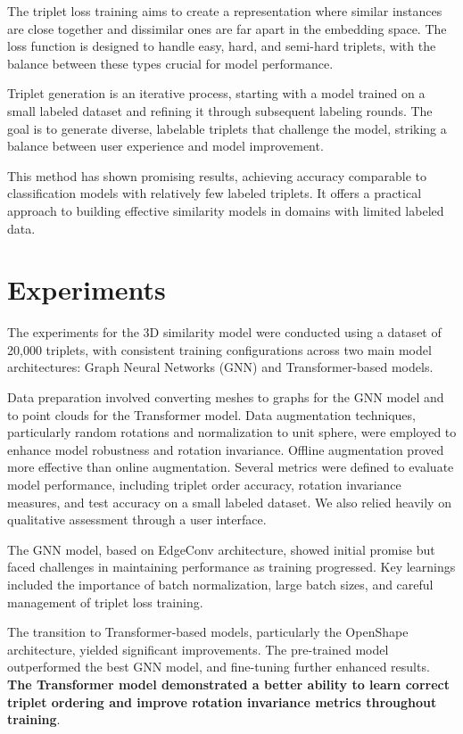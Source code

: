\documentclass{article}
\begin{document}
The triplet loss training aims to create a representation where similar instances are close together and dissimilar ones are far apart in the embedding space. The loss function is designed to handle easy, hard, and semi-hard triplets, with the balance between these types crucial for model performance.

Triplet generation is an iterative process, starting with a model trained on a small labeled dataset and refining it through subsequent labeling rounds. The goal is to generate diverse, labelable triplets that challenge the model, striking a balance between user experience and model improvement.

This method has shown promising results, achieving accuracy comparable to classification models with relatively few labeled triplets. It offers a practical approach to building effective similarity models in domains with limited labeled data.


\section{Experiments}

The experiments for the 3D similarity model were conducted using a dataset of 20,000 triplets, with consistent training configurations across two main model architectures: Graph Neural Networks (GNN) and Transformer-based models.

Data preparation involved converting meshes to graphs for the GNN model and to point clouds for the Transformer model. Data augmentation techniques, particularly random rotations and normalization to unit sphere, were employed to enhance model robustness and rotation invariance. Offline augmentation proved more effective than online augmentation.
Several metrics were defined to evaluate model performance, including triplet order accuracy, rotation invariance measures, and test accuracy on a small labeled dataset. We also relied heavily on qualitative assessment through a user interface.

The GNN model, based on EdgeConv architecture, showed initial promise but faced challenges in maintaining performance as training progressed. Key learnings included the importance of batch normalization, large batch sizes, and careful management of triplet loss training.

The transition to Transformer-based models, particularly the OpenShape architecture, yielded significant improvements. The pre-trained model outperformed the best GNN model, and fine-tuning further enhanced results. \textbf{The Transformer model demonstrated a better ability to learn correct triplet ordering and improve rotation invariance metrics throughout training}.
\end{document}
